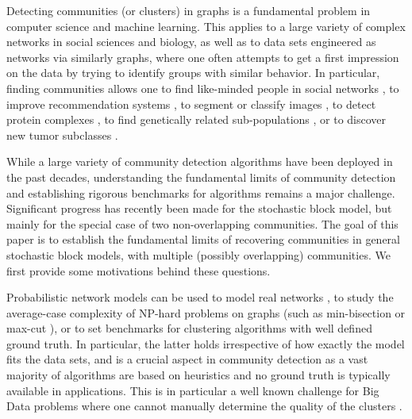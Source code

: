 \documentclass[11pt]{article}
\newcommand{\1}{\mathbb{1}}
\begin{document}
Detecting communities (or clusters) in graphs is a fundamental problem in computer science and machine learning. This applies to a large variety of complex networks in social sciences and biology, as well as to data sets engineered as networks via similarly graphs, where one often attempts to get a first impression on the data by trying to identify groups with similar behavior. 
In particular, finding communities allows one to find like-minded people in social networks \cite{newman-girvan,social1}, to improve recommendation systems \cite{amazon,xu-rec}, to segment or classify images \cite{image1,image2}, to detect protein complexes \cite{ppi2,marcotte}, to find genetically related sub-populations \cite{genetics,gene-survey}, or to discover new tumor subclasses \cite{tumor}. %

While a large variety of community detection algorithms have been deployed in the past decades,  understanding the fundamental limits of community detection and establishing rigorous benchmarks for algorithms remains a major challenge. Significant progress has recently been made for the stochastic block model, but mainly for the special case of two non-overlapping communities. The goal of this paper is to establish the fundamental limits of recovering communities in general stochastic block models, with multiple (possibly overlapping) communities. We first provide some motivations behind these questions.  

Probabilistic network models can be used to model real networks \cite{newman-book}, to study the average-case complexity of NP-hard problems on graphs (such as min-bisection or max-cut \cite{dyer,bui,condon,bollobas-cut}), or 
to set benchmarks for clustering algorithms with well defined ground truth. In particular, the latter holds irrespective of how exactly the model fits the data sets, and is a crucial aspect in community detection as a vast majority of algorithms are based on heuristics and no ground truth is typically available in applications. This is in particular a well known challenge for Big Data problems where one cannot manually determine the quality of the clusters \cite{asa}. 
\end{document}
